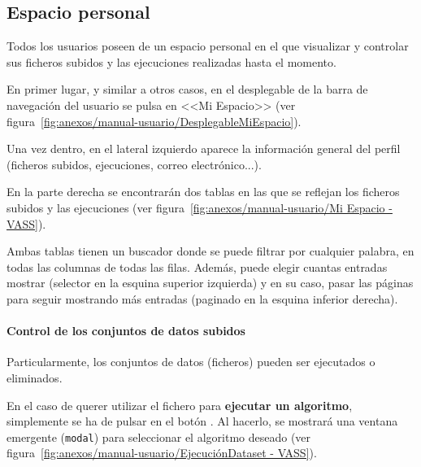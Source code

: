 \label{mu:perfil}

\subsection{Espacio personal}

Todos los usuarios poseen de un espacio personal en el que visualizar y
controlar sus ficheros subidos y las ejecuciones realizadas hasta el momento.

En primer lugar, y similar a otros casos, en el desplegable de la barra de
navegación del usuario se pulsa en <<Mi Espacio>> (ver
figura~\ref{fig:anexos/manual-usuario/DesplegableMiEspacio}).


Una vez dentro, en el lateral izquierdo aparece la información general del
perfil (ficheros subidos, ejecuciones, correo electrónico...).

En la parte derecha se encontrarán dos tablas en las que se reflejan los
ficheros subidos y las ejecuciones (ver figura~\ref{fig:anexos/manual-usuario/Mi
Espacio - VASS}).


Ambas tablas tienen un buscador donde se puede filtrar por cualquier palabra, en
todas las columnas de todas las filas. Además, puede elegir cuantas entradas
mostrar (selector en la esquina superior izquierda) y en su caso, pasar las
páginas para seguir mostrando más entradas (paginado en la esquina inferior
derecha).

\paragraph{Control de los conjuntos de datos subidos} Particularmente, los
conjuntos de datos (ficheros) pueden ser ejecutados o eliminados.

En el caso de querer utilizar el fichero para \textbf{ejecutar un algoritmo},
simplemente se ha de pulsar en el botón \button[vassgold]{$\blacktriangleright$}. Al
hacerlo, se mostrará una ventana emergente (\texttt{modal}) para seleccionar el
algoritmo deseado (ver figura~\ref{fig:anexos/manual-usuario/EjecuciónDataset -
VASS}).


